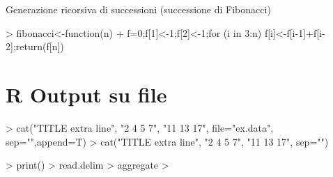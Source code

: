 \documentclass[onecolumn,11pt]{book}
\begin{document}
Generazione ricorsiva di successioni (successione di Fibonacci)
\begin{Schunk}
\begin{Sinput}
> fibonacci<-function(n) 
+ {f=0;f[1]<-1;f[2]<-1;for (i in 3:n) {f[i]<-f[i-1]+f[i-2]};return(f[n])}
\end{Sinput}
\end{Schunk}

\section{R  Output su file}

\begin{Schunk}
\begin{Sinput}
> cat("TITLE extra line", "2 4 5 7", "11 13 17", file="ex.data", sep="\n",append=T)
> cat("TITLE extra line", "2 4 5 7", "11 13 17", sep="\n")
\end{Sinput}
\end{Schunk}
\begin{Schunk}
\begin{Sinput}
> print()
> read.delim
>  aggregate
>  
\end{Sinput}
\end{Schunk}
\end{document}
